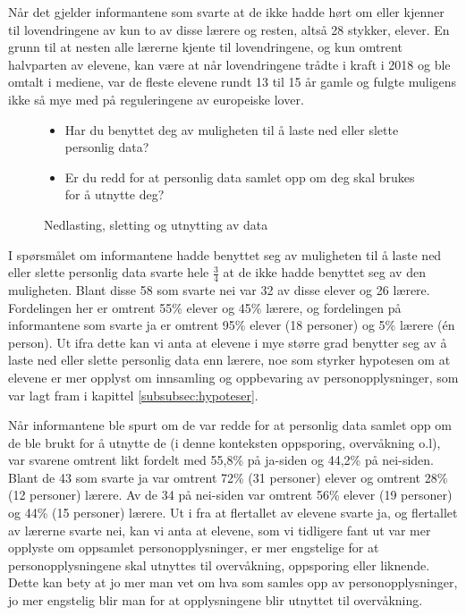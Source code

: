 Når det gjelder informantene som svarte at de ikke hadde hørt om eller kjenner til lovendringene av kun to av disse lærere og resten, altså 28 stykker, elever. En grunn til at nesten alle lærerne kjente til lovendringene, og kun omtrent halvparten av elevene, kan være at når lovendringene trådte i kraft i 2018 og ble omtalt i mediene, var de fleste elevene rundt 13 til 15 år gamle og fulgte muligens ikke så mye med på reguleringene av europeiske lover. 

\begin{figure}[H]
    \centering
    \begin{itemize}
        \item Har du benyttet deg av muligheten til å laste ned eller slette personlig data?
        \item Er du redd for at personlig data samlet opp om deg skal brukes for å utnytte deg?
    \end{itemize}
    \caption{Nedlasting, sletting og utnytting av data}
\end{figure}
I spørsmålet om informantene hadde benyttet seg av muligheten til å laste ned eller slette personlig data svarte hele $\frac{3}{4}$ at de ikke hadde benyttet seg av den muligheten. Blant disse 58 som svarte nei var 32 av disse elever og 26 lærere. Fordelingen her er omtrent 55\% elever og 45\% lærere, og fordelingen på informantene som svarte ja er omtrent 95\% elever (18 personer) og 5\% lærere (én person). Ut ifra dette kan vi anta at elevene i mye større grad benytter seg av å laste ned eller slette personlig data enn lærere, noe som styrker hypotesen om at elevene er mer opplyst om innsamling og oppbevaring av personopplysninger, som var lagt fram i kapittel \ref{subsubsec:hypoteser}.

Når informantene ble spurt om de var redde for at personlig data samlet opp om de ble brukt for å utnytte de (i denne konteksten oppsporing, overvåkning o.l), var svarene omtrent likt fordelt med 55,8\% på ja-siden og 44,2\% på nei-siden. Blant de 43 som svarte ja var omtrent 72\% (31 personer) elever og omtrent 28\% (12 personer) lærere. Av de 34 på nei-siden var omtrent 56\% elever (19 personer) og 44\% (15 personer) lærere. Ut i fra at flertallet av elevene svarte ja, og flertallet av lærerne svarte nei, kan vi anta at elevene, som vi tidligere fant ut var mer opplyste om oppsamlet personopplysninger, er mer engstelige for at personopplysningene skal utnyttes til overvåkning, oppsporing eller liknende. Dette kan bety at jo mer man vet om hva som samles opp av personopplysninger, jo mer engstelig blir man for at opplysningene blir utnyttet til overvåkning.

